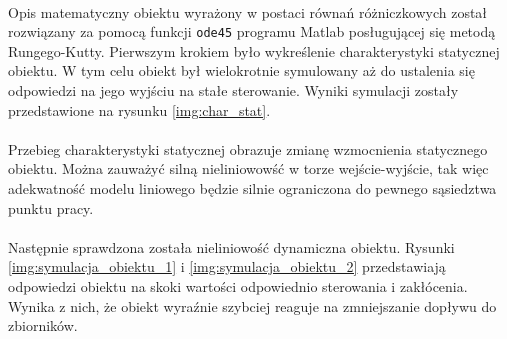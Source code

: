 \documentclass[a4paper,12pt]{article}
\begin{document}
\paragraph{}
Opis matematyczny obiektu wyrażony w postaci równań różniczkowych został rozwiązany za pomocą funkcji \texttt{ode45} programu Matlab posługującej się metodą Rungego-Kutty.
Pierwszym krokiem było wykreślenie charakterystyki statycznej obiektu.
W tym celu obiekt był wielokrotnie symulowany aż do ustalenia się odpowiedzi na jego wyjściu na stałe sterowanie.
Wyniki symulacji zostały przedstawione na rysunku \ref{img:char_stat}.

\paragraph{}
Przebieg charakterystyki statycznej obrazuje zmianę wzmocnienia statycznego obiektu.
Można zauważyć silną nieliniowowść w torze wejście-wyjście, tak więc adekwatność modelu liniowego będzie silnie ograniczona do pewnego sąsiedztwa punktu pracy.

\paragraph{}
Następnie sprawdzona została nieliniowość dynamiczna obiektu.
Rysunki \ref{img:symulacja_obiektu_1} i \ref{img:symulacja_obiektu_2} przedstawiają odpowiedzi obiektu na skoki wartości odpowiednio sterowania i zakłócenia.
Wynika z nich, że obiekt wyraźnie szybciej reaguje na zmniejszanie dopływu do zbiorników.
\end{document}
